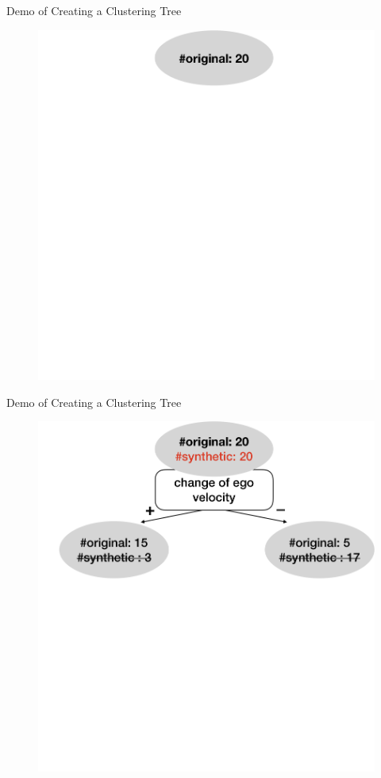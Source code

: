 \documentclass[shortpres]{beamer}
\begin{document}
  \begin{frame}{Demo of Creating a Clustering Tree}	
    \begin{figure}
      \includegraphics[height=0.6\textheight]{fig/cltree.png}
    \end{figure}
  \end{frame}
  \begin{frame}{Demo of Creating a Clustering Tree}	
    \begin{figure}
      \includegraphics[height=0.6\textheight]{fig/cltree1.png}
    \end{figure}
  \end{frame}
\end{document}

